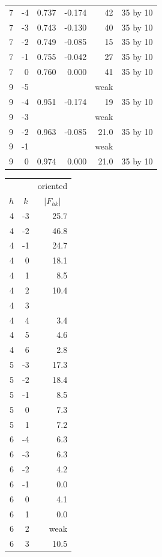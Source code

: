 \begin{table}[htbp]
\begin{tabular}{rrrrrr}
    7 & -4 & 0.737 & -0.174 &	    42 & 35 by 10 \\
    7	& -3 & 0.743 & -0.130	&     40 & 35 by 10 \\
    7	& -2 & 0.749 & -0.085	&     15 & 35 by 10 \\
    7	& -1 & 0.755 & -0.042	&     27 & 35 by 10 \\
    7 &  0 & 0.760 &  0.000	&     41 & 35 by 10 \\
    9 & -5 &       &        &	  weak & \\
    9 &	-4 & 0.951 & -0.174	&	    19 & 35 by 10 \\
    9 & -3 &       &        &	  weak & \\
    9 & -2 & 0.963 & -0.085 &   21.0 & 35 by 10 \\
	  9	& -1 &       &        &   weak & \\
	  9 &  0 & 0.974 &  0.000	&   21.0 & 35 by 10 \\
    \hline
  \end{tabular}
  \quad
  \begin{tabular}{rrr}
    \hline
     & & \multicolumn{1}{c}{oriented} \\
    \multicolumn{1}{c}{$h$} & \multicolumn{1}{c}{$k$} & \multicolumn{1}{c}{$|F_{hk}|$} \\
    \hline
    4 & -3 & 25.7 \\
4 & -2 & 46.8 \\ 
4 & -1 & 24.7 \\
4 & 0 & 18.1 \\ 
4 & 1 & 8.5 \\ 
4 & 2 & 10.4 \\ 
4 & 3 \\ 
4 & 4 & 3.4 \\
4 & 5 & 4.6 \\ 
4 & 6 & 2.8 \\ 
5 & -3 & 17.3 \\ 
5 & -2 & 18.4 \\ 
5 & -1 & 8.5 \\ 
5 & 0 & 7.3 \\ 
5 & 1 & 7.2 \\ 
6 & -4 & 6.3 \\ 
6 & -3 & 6.3 \\ 
6 & -2 & 4.2 \\ 
6 & -1 & 0.0 \\ 
6 & 0 & 4.1 \\ 
6 & 1 & 0.0 \\ 
6 & 2 & weak\\
6 & 3 & 10.5 \\

\end{tabular}
\end{table}
